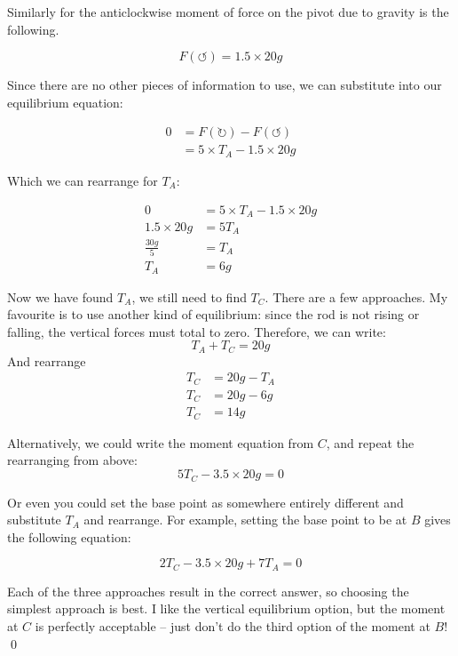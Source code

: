 \begin{solution}
    Similarly for the anticlockwise moment of force on the pivot due to gravity is the following.

    \[F(\circlearrowleft) = 1.5 \times 20g\]

    Since there are no other pieces of information to use, we can substitute into our equilibrium equation:

    \begin{align*}
        0 &=  F(\circlearrowright) - F(\circlearrowleft) \\
         &= 5 \times T_A - 1.5 \times 20g
    \end{align*}

    Which we can rearrange for $T_A$:

    \begin{align*}
        0 &= 5 \times T_A - 1.5 \times 20g \\
        1.5 \times 20g &= 5 T_A \\
        \frac{30g}{5} &= T_A \\
        T_A &= 6g
    \end{align*}
    
    Now we have found $T_A$, we still need to find $T_C$. There are a few approaches. My favourite is to use another kind of equilibrium: since the rod is not rising or falling, the vertical forces must total to zero.
    Therefore, we can write:
    \[T_A + T_C = 20g\]
    And rearrange 
    \begin{align*}
        T_C &= 20g - T_A \\
        T_C &= 20g - 6g \tag{substituting $T_A$}\\
        T_C &= 14g
    \end{align*}

    Alternatively, we could write the moment equation from $C$, and repeat the rearranging from above:
    \[ 5T_C - 3.5 \times 20g = 0\]

    Or even you could set the base point as somewhere entirely different and substitute $T_A$ and rearrange. For example, setting the base point to be at $B$ gives the following equation:

    \[2T_C - 3.5\times 20g + 7T_A = 0\]

    Each of the three approaches result in the correct answer, so choosing the simplest approach is best. I like the vertical equilibrium option, but the moment at $C$ is perfectly acceptable -- just don't do the third option of the moment at $B$!
    \qed
\end{solution}

